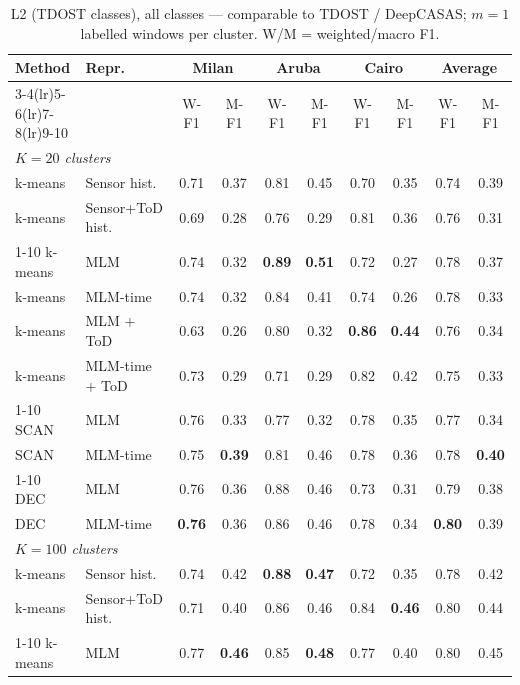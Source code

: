 \begin{table}[t]
\centering\small
\caption{L2 (TDOST classes), all classes --- comparable to TDOST / DeepCASAS; $m=1$ labelled windows per cluster. W/M = weighted/macro F1.}
\label{tab:l2_all_m1}
\setlength{\tabcolsep}{4pt}
\begin{tabular}{llcccccc|cc}
\toprule
Method & Repr. & \multicolumn{2}{c}{Milan} & \multicolumn{2}{c}{Aruba} & \multicolumn{2}{c}{Cairo} & \multicolumn{2}{c}{Average} \\
\cmidrule(lr){3-4}\cmidrule(lr){5-6}\cmidrule(lr){7-8}\cmidrule(lr){9-10}
 & & W-F1 & M-F1 & W-F1 & M-F1 & W-F1 & M-F1 & W-F1 & M-F1 \\
\midrule
\multicolumn{10}{l}{\textit{$K = 20$ clusters}} \\
\midrule
k-means & Sensor hist. & 0.71 & 0.37 & 0.81 & 0.45 & 0.70 & 0.35 & 0.74 & 0.39 \\
k-means & Sensor+ToD hist. & 0.69 & 0.28 & 0.76 & 0.29 & 0.81 & 0.36 & 0.76 & 0.31 \\
\cmidrule{1-10}
k-means & MLM & 0.74 & 0.32 & \textbf{0.89} & \textbf{0.51} & 0.72 & 0.27 & 0.78 & 0.37 \\
k-means & MLM-time & 0.74 & 0.32 & 0.84 & 0.41 & 0.74 & 0.26 & 0.78 & 0.33 \\
k-means & MLM + ToD & 0.63 & 0.26 & 0.80 & 0.32 & \textbf{0.86} & \textbf{0.44} & 0.76 & 0.34 \\
k-means & MLM-time + ToD & 0.73 & 0.29 & 0.71 & 0.29 & 0.82 & 0.42 & 0.75 & 0.33 \\
\cmidrule{1-10}
SCAN & MLM & 0.76 & 0.33 & 0.77 & 0.32 & 0.78 & 0.35 & 0.77 & 0.34 \\
SCAN & MLM-time & 0.75 & \textbf{0.39} & 0.81 & 0.46 & 0.78 & 0.36 & 0.78 & \textbf{0.40} \\
\cmidrule{1-10}
DEC & MLM & 0.76 & 0.36 & 0.88 & 0.46 & 0.73 & 0.31 & 0.79 & 0.38 \\
DEC & MLM-time & \textbf{0.76} & 0.36 & 0.86 & 0.46 & 0.78 & 0.34 & \textbf{0.80} & 0.39 \\
\midrule
\multicolumn{10}{l}{\textit{$K = 100$ clusters}} \\
\midrule
k-means & Sensor hist. & 0.74 & 0.42 & \textbf{0.88} & \textbf{0.47} & 0.72 & 0.35 & 0.78 & 0.42 \\
k-means & Sensor+ToD hist. & 0.71 & 0.40 & 0.86 & 0.46 & 0.84 & \textbf{0.46} & 0.80 & 0.44 \\
\cmidrule{1-10}
k-means & MLM & 0.77 & \textbf{0.46} & 0.85 & \textbf{0.48} & 0.77 & 0.40 & 0.80 & 0.45 \\

\end{tabular}
\end{table}

